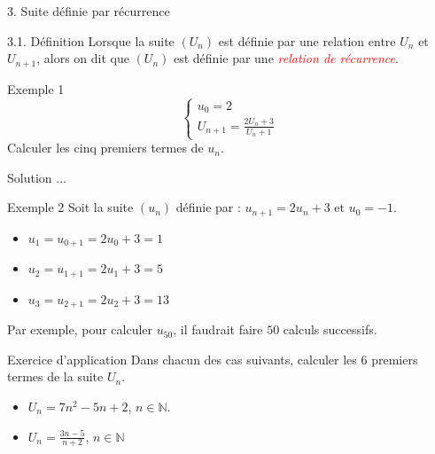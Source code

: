 \documentclass{beamer}
\begin{document}
\begin{frame}{3. Suite définie par récurrence}
    \begin{block}{3.1. Définition}
        Lorsque la suite $(U_n)$ est définie par une relation entre $U_n$ et $U_{n+1}$, alors on dit que $(U_n)$ est définie par une \textcolor{red}{\textit{relation de récurrence}}.
    \end{block}
    \begin{exampleblock}{Exemple 1}
        \[
        \begin{cases}
            u_{0}=2 \\
            U_{n + 1}=\frac{2U_n + 3}{U_n + 1}
        \end{cases}
        \]
        Calculer les cinq premiers termes de $u_{n}$.
    \end{exampleblock}
    \begin{block}{Solution}
        ...
    \end{block}
    \begin{exampleblock}{Exemple 2}
        Soit la suite $\left(u_{n}\right)$ définie par : $u_{n+1}=2u_{n}+3\text{ et }u_{0}=-1.$
        \begin{itemize}
            \item $u_{1}=u_{0+1}=2u_{0}+3=1$
            \item $u_{2}=u_{1+1}=2u_{1}+3=5$
            \item $u_{3}=u_{2+1}=2u_{2}+3=13$
        \end{itemize}
        Par exemple, pour calculer $u_{50}$, il faudrait faire $50$ calculs successifs.
    \end{exampleblock}
\end{frame}

\begin{frame}{Exercice d'application}
    Dans chacun des cas suivants, calculer les $6$ premiers termes de la suite $U_{n}$.
    \begin{itemize}
        \item $U_{n} = 7n^{2} - 5n + 2$, $n \in \mathbb{N}$.
        \item $U_{n}=\frac{3n-5}{n+2}$, $n \in \mathbb{N}$
    \end{itemize}
\end{frame}
\end{document}
